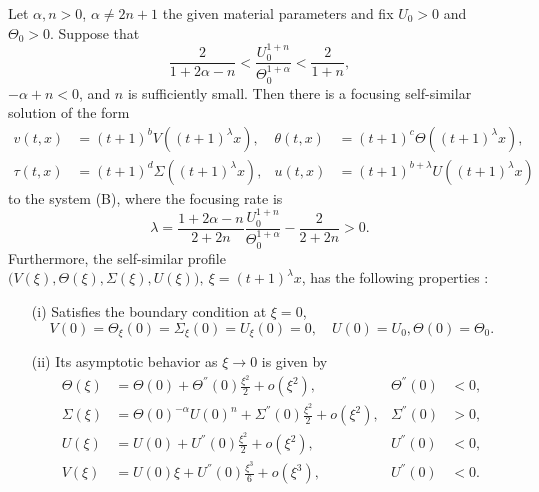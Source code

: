 \documentclass[graybox]{svmult}
\begin{document}
\begin{theorem} \label{thm1}
Let $\alpha,n>0$, $\alpha\ne2n+1$ the given material parameters and fix $U_0>0$ and $\Theta_0>0$. Suppose that
\begin{equation} \label{eq:restriction}
 \frac{2}{1+2\alpha-n} < \frac{U_0^{1+n}}{\Theta_0^{1+\alpha}} < \frac{2}{1+n},
\end{equation}
$-\alpha+n<0$, and $n$ is sufficiently small. Then there is a focusing self-similar solution of the form
\begin{equation*}
\begin{aligned}
 v(t,x) &= (t+1)^b V((t+1)^\lambda x), &\theta(t,x) &= (t+1)^c \Theta((t+1)^\lambda x),\\
 \tau(t,x) &= (t+1)^d \Sigma((t+1)^\lambda x), & u(t,x) &= (t+1)^{b+\lambda} U((t+1)^\lambda x)
\end{aligned}
\end{equation*}
to the system (B), where the focusing rate is 
\begin{equation}
 \lambda = \frac{1+2\alpha-n}{2+2n}\frac{U_0^{1+n}}{\Theta_0^{1+\alpha}} - \frac{2}{2+2n}>0. \label{eq:lambda}
\end{equation}
Furthermore, the self-similar profile $\big(V(\xi),\Theta(\xi),\Sigma(\xi),U(\xi)\big), \ \xi = (t+1)^\lambda x$,  has the  following properties :
 \begin{enumerate}
  \item[(i)] Satisfies the boundary condition at $\xi=0$,
    \begin{equation*}
    {V}(0) = \Theta_\xi(0)=\Sigma_\xi(0) = {U}_\xi(0)=0, \quad U(0)=U_0, \Theta(0)=\Theta_0.
  \end{equation*}
  \item[(ii)] Its asymptotic behavior as $\xi \rightarrow 0$ is given by 
  \begin{equation} \label{eq:ss_asymp0}
  \begin{aligned}
    \Theta(\xi) &= \Theta(0) + \Theta^{''}(0)\frac{\xi^2}{2} + o(\xi^2), & \Theta^{''}(0)&<0,\\
    \Sigma(\xi) &= \Theta(0)^{-\alpha}{U(0)^n}+ \Sigma^{''}(0)\frac{\xi^2}{2} + o(\xi^2), & \Sigma^{''}(0)&>0, \\
    U(\xi) &= U(0) + U^{''}(0)\frac{\xi^2}{2} + o(\xi^2), & U^{''}(0)&<0,\\
    V(\xi) &= U(0)\xi + U^{''}(0)\frac{\xi^3}{6} + o(\xi^3), & U^{''}(0)&<0.

\end{aligned}
\end{equation}
\end{enumerate}
\end{theorem}
\end{document}
